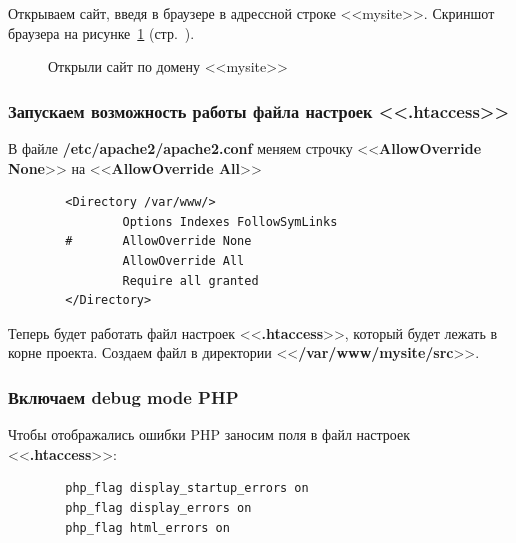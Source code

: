 Открываем сайт, введя в браузере в адрессной строке <<mysite>>.
Скриншот браузера на рисунке~\ref{fig:browser-mysite} (стр.~\pageref{fig:browser-mysite}).

\begin{figure}[tp]
    \caption{Открыли сайт по домену <<mysite>>}
    \label{fig:browser-mysite}
\end{figure}

\newpage


\subsubsection*{Запускаем возможность работы файла настроек <<.htaccess>>}

В файле \textbf{/etc/apache2/apache2.conf} меняем строчку <<\textbf{AllowOverride None}>> на <<\textbf{AllowOverride All}>>

\begin{verbatim}
        <Directory /var/www/>
                Options Indexes FollowSymLinks
        #       AllowOverride None
                AllowOverride All
                Require all granted
        </Directory>
\end{verbatim}

Теперь будет работать файл настроек <<\textbf{.htaccess}>>, который будет лежать в корне проекта. Создаем файл в директории <<\textbf{/var/www/mysite/src}>>.



\subsubsection*{Включаем debug mode PHP}

Чтобы отображались ошибки PHP заносим поля в файл настроек <<\textbf{.htaccess}>>:

\begin{verbatim}
        php_flag display_startup_errors on
        php_flag display_errors on
        php_flag html_errors on
\end{verbatim}

